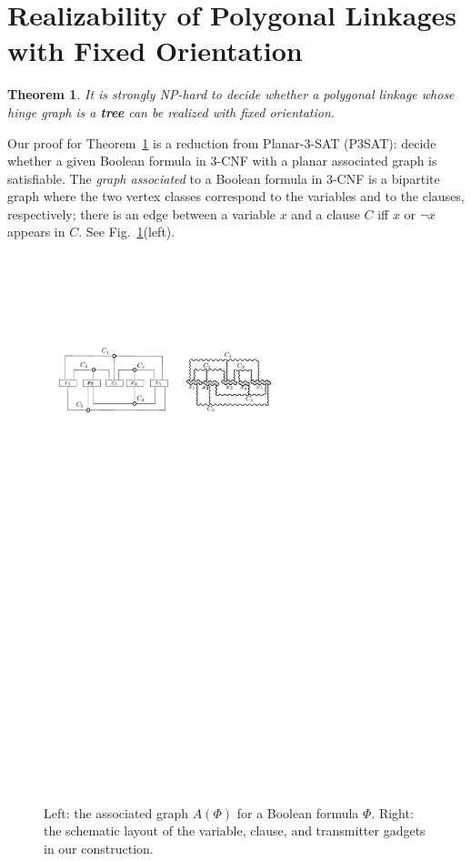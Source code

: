 \documentclass{article}
\theoremstyle{plain}%
\newtheorem{theorem}{Theorem}
\begin{document}
\section{Realizability of Polygonal Linkages with Fixed Orientation\label{sec:hinge}}

\begin{theorem}\label{thm:hinge2}
It is strongly NP-hard to decide whether a polygonal linkage whose hinge graph is a \textbf{tree} can be realized with fixed orientation.
\end{theorem}

Our proof for Theorem~\ref{thm:hinge2} is a reduction from {\sc Planar-3-SAT} (P3SAT): decide whether a given Boolean formula in 3-CNF with a planar associated graph is satisfiable. The \emph{graph associated} to a Boolean formula in 3-CNF is a bipartite graph where the two vertex classes correspond to the variables and to the clauses, respectively; there is an edge between a variable $x$ and a clause $C$ iff $x$ or $\neg x$ appears in $C$. See Fig.~\ref{fig:assoc}(left).

\begin{figure}[htbp]
	\centering
	\includegraphics[width=0.7\columnwidth]{fig-assoc-hex}
	\caption[]{Left: the associated graph $A(\Phi)$ for a Boolean formula $\Phi$.
Right: the schematic layout of the variable, clause, and transmitter gadgets in our construction.}
	\label{fig:assoc}
\end{figure}
\end{document}
